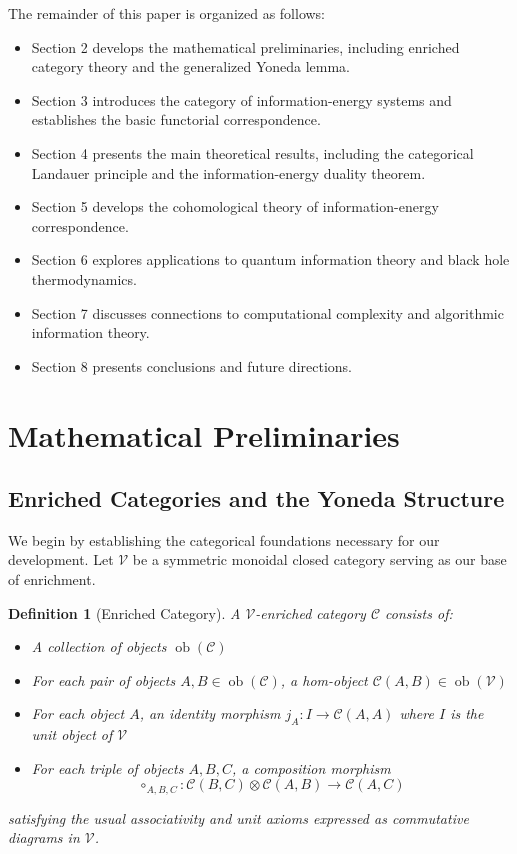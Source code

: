 \documentclass[12pt]{article}
\newtheorem{definition}[theorem]{Definition}
\DeclareMathOperator{\ob}{ob}
\begin{document}
The remainder of this paper is organized as follows:

\begin{itemize}
\item Section 2 develops the mathematical preliminaries, including enriched category theory and the generalized Yoneda lemma.

\item Section 3 introduces the category of information-energy systems and establishes the basic functorial correspondence.

\item Section 4 presents the main theoretical results, including the categorical Landauer principle and the information-energy duality theorem.

\item Section 5 develops the cohomological theory of information-energy correspondence.

\item Section 6 explores applications to quantum information theory and black hole thermodynamics.

\item Section 7 discusses connections to computational complexity and algorithmic information theory.

\item Section 8 presents conclusions and future directions.
\end{itemize}

\section{Mathematical Preliminaries}

\subsection{Enriched Categories and the Yoneda Structure}

We begin by establishing the categorical foundations necessary for our development. Let $\mathcal{V}$ be a symmetric monoidal closed category serving as our base of enrichment.

\begin{definition}[Enriched Category]
A $\mathcal{V}$-enriched category $\mathcal{C}$ consists of:
\begin{itemize}
\item A collection of objects $\ob(\mathcal{C})$
\item For each pair of objects $A, B \in \ob(\mathcal{C})$, a hom-object $\mathcal{C}(A,B) \in \ob(\mathcal{V})$
\item For each object $A$, an identity morphism $j_A: I \to \mathcal{C}(A,A)$ where $I$ is the unit object of $\mathcal{V}$
\item For each triple of objects $A, B, C$, a composition morphism 
\[\circ_{A,B,C}: \mathcal{C}(B,C) \otimes \mathcal{C}(A,B) \to \mathcal{C}(A,C)\]
\end{itemize}
satisfying the usual associativity and unit axioms expressed as commutative diagrams in $\mathcal{V}$.
\end{definition}
\end{document}
